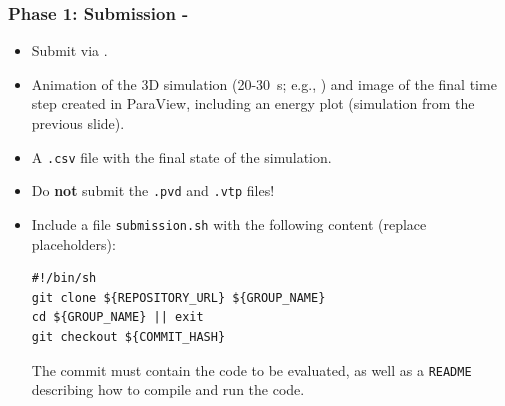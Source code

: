 \begin{frame}[fragile]
  \frametitle{Phase 1: Submission - \dateDeadlinePhaseOne}
  \vspace*{-1em}
  \begin{itemize}
      \item Submit via .
      \item Animation of the 3D simulation (\num{20}-\SI{30}{\second}; e.g., ) and image of the final time step created in ParaView, including an energy plot (simulation from the previous slide).
      \item A \texttt{.csv} file with the final state of the simulation.
      \item Do \textbf{not} submit the \texttt{.pvd} and \texttt{.vtp} files!
      \item Include a file \texttt{submission.sh} with the following content (replace placeholders): \vspace*{.5em}
      \begin{verbatim}
#!/bin/sh
git clone ${REPOSITORY_URL} ${GROUP_NAME}
cd ${GROUP_NAME} || exit
git checkout ${COMMIT_HASH}
      \end{verbatim}

      The commit must contain the code to be evaluated, as well as a \texttt{README} describing how to compile and run the code.
  \end{itemize}
\end{frame}



